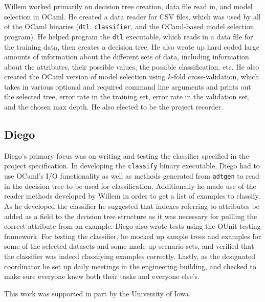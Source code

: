 \documentclass[screen, authorversion, nonacm, sigconf]{acmart}
\begin{document}
Willem worked primarily on decision tree creation, data file read in, and model selection in OCaml. He created a data reader for CSV files, which was used by all of the OCaml binaries (\texttt{dtl}, \texttt{classifier}, and the OCaml-based model selection program). He helped program the \texttt{dtl} executable, which reads in a data file for the training data, then creates a decision tree. He also wrote up hard coded large amounts of information about the different sets of data, including information about the attributes, their possible values, the possible classification, etc. He also created the OCaml version of model selection using $k$-fold cross-validation, which takes in various optional and required command line arguments and prints out the selected tree, error rate in the training set, error rate in the validation set, and the chosen max depth. He also elected to be the project recorder.

\subsection{Diego}

Diego's primary focus was on writing and testing the classifier specified in the project specification. In developing the \texttt{classify} binary executable, Diego had to use OCaml's I/O functionality as well as methods generated from \texttt{adtgen} to read in the decision tree to be used for classification. Additionally he made use of the reader methods developed by Willem in order to get a list of examples to classify. As he developed the classifier he suggested that indexes referring to attributes be added as a field to the decision tree structure as it was necessary for pullling the correct attribute from an example. Diego also wrote tests using the OUnit testing framework. For testing the classifier, he mocked up sample trees and examples for some of the selected datasets and some made up scenario sets, and verified that the classifier was indeed classifying examples correctly. Lastly, as the designated coordinator he set up daily meetings in the engineering building, and checked to make sure everyone knew both their tasks and everyone else's.

\begin{acks}
This work was supported in part by the University of Iowa.
\end{acks}
\end{document}
